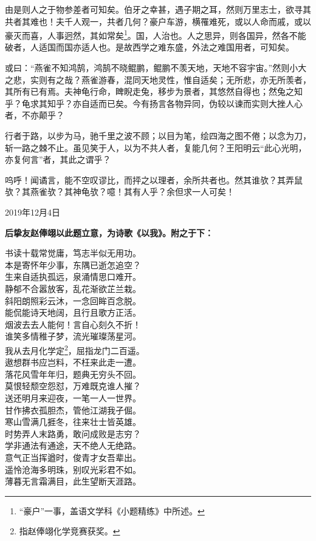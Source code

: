 \documentclass[a5paper]{ctexart}
\begin{document}
	由是则人之于物参差者可知矣。伯牙之幸甚，遇子期之耳，然则万里志士，欲寻其共者其难也！夫千人观一，共者几何？豪户车游，横罹难死，或以人命而戚，或以豪灭而喜，人事迥然，其如常矣\footnote{“豪户”一事，盖语文学科《小题精练》中所述。}。国，人治也。人之思异，则各国异，然各不能破者，人适国而国亦适人也。是故西学之难东盛，外法之难国用者，可知矣。
	
	或曰：“燕雀不知鸿鹄，鸿鹄不晓鲲鹏，鲲鹏不羡天地，天地不容宇宙。”然则小大之悲，实则有之哉？燕雀游春，混同天地灵性，惟自适矣；无所悲，亦无所羡者，其所有已有焉。夫神龟行命，睥睨走兔，移步为景者，其悠然自得也；然兔之知乎？龟求其知乎？亦自适而已矣。今有扬言各物异同，伪较以谏而实则大挫人心者，不亦颠乎？
	
	行者于路，以步为马，驰千里之波不顾；以目为笔，绘四海之图不倦；以念为刀，斩一路之棘不止。虽见笑于人，以为不共人者，复能几何？王阳明云“此心光明，亦复何言”者，其此之谓乎？
	
	呜呼！闻谲言，能不空叹谬比，而抨之以理者，余所共者也。然其谁欤？其弄鼠欤？其燕雀欤？其神龟欤？噫！其有人乎？余但求一人可矣！
	\begin{flushright}
		2019年12月4日
	\end{flushright}
	\begin{flushleft}
		\textbf{后挚友赵俸翊以此题立意，为诗歌《以我》。附之于下：}
	\end{flushleft}
	\begin{center}
		书读十载常觉庸，笃志半似无用功。\\
		本是寄怀年少事，东隅已逝怎追空？\\
		生来自适执孤远，泉涌情思口难开。\\
		静郁不合嚣放客，乱花渐欲芷兰栽。\\
		斜阳朗照彩云沐，一念回眸百念脱。\\
		能侃能诗天地阔，且行且歌方正活。\\
		烟波去去人能何！言自心刻久不折！\\
		谁笑多情稚子梦，流光璀璨荡星河。\\
		我从去月化学定\footnote{指赵俸翊化学竞赛获奖。}，屈指龙门二百遥。\\
		遨想群书应岂料，不枉来此走一遭。\\
		落花风雪年年归，题典无穷头不回。\\
		莫恨轻颓空怨怼，万难既克谁人摧？\\
		送还明月来迎夜，一笔一人一世界。\\
		甘作拂衣孤胆杰，管他江湖我孑倔。\\
		寒山雪满几捱冬，往来壮士皆英雄。\\
		时势弄人末路勇，敢问成败是志穷？\\
		学非通法有通途，天不绝人无绝路。\\
		意气正当挥遒时，俊青才女吾辈出。\\
		遥怜沧海多明珠，别叹光彩君不如。\\
		薄暮无言霜满目，此生望断天涯路。
		
	\end{center}
	
\end{document}
